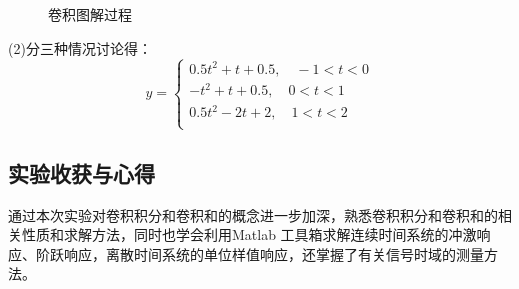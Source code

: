 \documentclass[UTF8,AutoFakeBold]{ctexart}
\begin{document}
\begin{enumerate}
\begin{figure}[H]
{			}
			\caption{卷积图解过程}
		\end{figure}
			(2)分三种情况讨论得：
			\[ y= \begin{cases}
			0.5t^2+t+0.5,\quad -1<t<0 \\
			-t^2+t+0.5,\quad 0<t<1 \\
			0.5t^2-2t+2,\quad 1<t<2\\
			\end{cases} \]
	\end{enumerate}
	\subsection{{\heiti{}实验收获与心得}}
	通过本次实验对卷积积分和卷积和的概念进一步加深，熟悉卷积积分和卷积和的相关性质和求解方法，同时也学会利用Matlab 工具箱求解连续时间系统的冲激响应、阶跃响应，离散时间系统的单位样值响应，还掌握了有关信号时域的测量方法。
\end{document}
